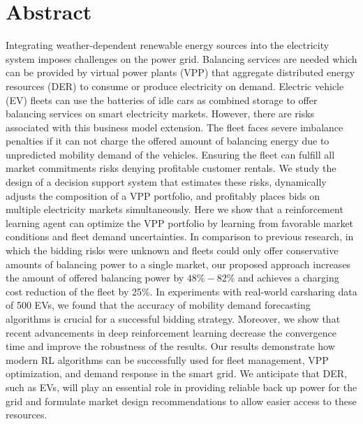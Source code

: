 \thispagestyle{empty}
\vspace*{\fill}
\section*{Abstract} Integrating weather-dependent renewable energy sources
into the electricity system imposes challenges on the power grid. Balancing
services are needed which can be provided by virtual power plants (VPP) that
aggregate distributed energy resources (DER) to consume or produce electricity
on demand. Electric vehicle (EV) fleets can use the batteries of idle cars as
combined storage to offer balancing services on smart electricity markets.
However, there are risks associated with this business model extension. The
fleet faces severe imbalance penalties if it can not charge the offered amount
of balancing energy due to unpredicted mobility demand of the vehicles. Ensuring
the fleet can fulfill all market commitments risks denying profitable customer
rentals. We study the design of a decision support system that estimates these
risks, dynamically adjusts the composition of a VPP portfolio, and profitably
places bids on multiple electricity markets simultaneously. Here we show that a
reinforcement learning agent can optimize the VPP portfolio by learning from
favorable market conditions and fleet demand uncertainties. In comparison to
previous research, in which the bidding risks were unknown and fleets could only
offer conservative amounts of balancing power to a single market, our proposed
approach increases the amount of offered balancing power by $48\% - 82\%$  and
achieves a charging cost reduction of the fleet by 25\%. In experiments with
real-world carsharing data of 500 EVs, we found that the accuracy of mobility
demand forecasting algorithms is crucial for a successful bidding strategy.
Moreover, we show that recent advancements in deep reinforcement learning
decrease the convergence time and improve the robustness of the results. Our
results demonstrate how modern RL algorithms can be successfully used for fleet
management, VPP optimization, and demand response in the smart grid. We
anticipate that DER, such as EVs, will play an essential role in providing
reliable back up power for the grid and formulate market design recommendations
to allow easier access to these resources.

\vspace*{\fill}
\clearpage
